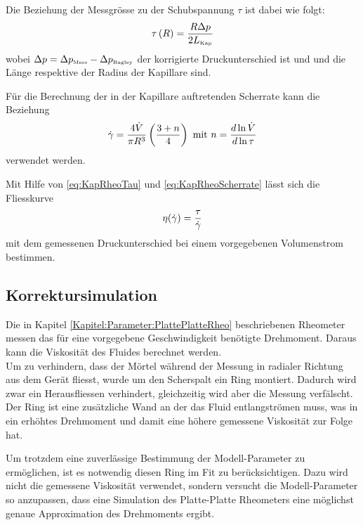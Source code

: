 Die Beziehung der Messgrösse  zu der Schubspannung $\tau$ ist dabei wie folgt:
\begin{equation}
    \label{eq:KapRheoTau}
    \tau\left( R \right) = \frac{R \Delta p}{2L_\text{\tiny Kap}}
\end{equation}
wobei $\Delta p = \Delta p_{\mbox{\tiny Mess}} -\Delta p_{\mbox{\tiny Bagley}}$ der korrigierte Druckunterschied ist und  und  die Länge respektive der Radius der Kapillare sind.

Für die Berechnung der in der Kapillare auftretenden Scherrate kann die Beziehung
\begin{equation}
    \label{eq:KapRheoScherrate}
    \dot\gamma = \frac{4 \dot{V}}{\pi R^3}\left( \frac{3+n}{4} \right) \mbox{ mit } n=\frac{d \ln \dot{V}}{d\ln\tau}
\end{equation}
verwendet werden. 

Mit Hilfe von \eqref{eq:KapRheoTau} und \eqref{eq:KapRheoScherrate} lässt sich die Fliesskurve 
\begin{equation}
    \eta(\dot\gamma) = \frac{\tau}{\dot\gamma}
\end{equation}
mit dem gemessenen Druckunterschied bei einem vorgegebenen Volumenstrom bestimmen.
%
%
\subsection{Korrektursimulation}
\label{Kapitel:Korrektursimulation}
Die in Kapitel \ref{Kapitel:Parameter:PlattePlatteRheo} beschriebenen Rheometer messen das für eine vorgegebene Geschwindigkeit benötigte Drehmoment. Daraus kann die Viskosität des Fluides berechnet werden.\\
Um zu verhindern, dass der Mörtel während der Messung in radialer Richtung aus dem Gerät fliesst, wurde um den Scherspalt ein Ring montiert. Dadurch wird zwar ein Herausfliessen verhindert, gleichzeitig wird aber die Messung verfälscht. Der Ring ist eine zusätzliche Wand an der das Fluid entlangströmen muss, was in ein erhöhtes Drehmoment und damit eine höhere gemessene Viskosität zur Folge hat.

Um trotzdem eine zuverlässige Bestimmung der Modell-Parameter zu ermöglichen, ist es notwendig diesen Ring im Fit zu berücksichtigen. Dazu wird nicht die gemessene Viskosität verwendet, sondern versucht die Modell-Parameter so anzupassen, dass eine Simulation des Platte-Platte Rheometers eine möglichst genaue Approximation des Drehmoments ergibt.

